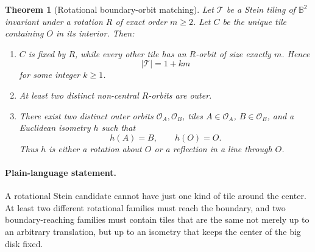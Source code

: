 \documentclass[10.5pt]{article}
\newtheorem{theorem}{Theorem}
\theoremstyle{remark}
\newcommand{\B}{\mathbb B}
\begin{document}
\begin{theorem}[Rotational boundary-orbit matching]\label{thm:main}
Let $\mathcal T$ be a Stein tiling of $\B^2$ invariant under a rotation $R$ of exact order $m\ge2$. Let $C$ be the unique tile containing $O$ in its interior. Then:

\begin{enumerate}[label=\textup{(\roman*)}]
\item $C$ is fixed by $R$, while every other tile has an $R$-orbit of size exactly $m$. Hence
\[
 |\mathcal T|=1+km
\]
for some integer $k\ge1$.

\item At least two \emph{distinct} non-central $R$-orbits are outer.

\item There exist two distinct outer orbits $\mathcal O_A,\mathcal O_B$, tiles $A\in\mathcal O_A$, $B\in\mathcal O_B$, and a Euclidean isometry $h$ such that
\[
 h(A)=B,\qquad h(O)=O.
\]
Thus $h$ is either a rotation about $O$ or a reflection in a line through $O$.
\end{enumerate}
\end{theorem}

\paragraph{Plain-language statement.}
A rotational Stein candidate cannot have just one kind of tile around the center. At least two different rotational families must reach the boundary, and two boundary-reaching families must contain tiles that are the same not merely up to an arbitrary translation, but up to an isometry that keeps the center of the big disk fixed.
\end{document}
